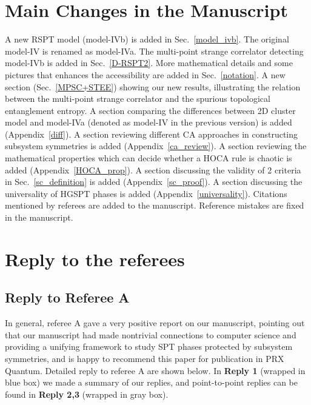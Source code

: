 \documentclass{article}
\begin{document}
\tableofcontents

\section{Main Changes in the Manuscript}
\begin{outline}[enumerate]
    \1 A new RSPT model (model-IVb) is added in Sec.~\ref{model_ivb}. The original model-IV is renamed as model-IVa.
    \1 The multi-point strange correlator detecting model-IVb is added in Sec.~\ref{D-RSPT2}.
    \1 More mathematical details and some pictures that enhances the accessibility are added in Sec.~\ref{notation}.
    \1 A new section (Sec.~\ref{MPSC+STEE}) showing our new results, illustrating the relation between the multi-point strange correlator and the spurious topological entanglement entropy.
    \1 A section comparing the differences between 2D cluster model and model-IVa (denoted as model-IV in the previous version) is added (Appendix~\ref{diff}).
    \1 A section reviewing different CA approaches in constructing subsystem symmetries is added (Appendix~\ref{ca_review}).
    \1 A section reviewing the mathematical properties which can decide whether a HOCA rule is chaotic is added (Appendix~\ref{HOCA_prop}).
    \1 A section discussing the validity of 2 criteria in Sec.~\ref{sc_definition} is added (Appendix~\ref{sc_proof}).
    \1 A section discussing the universality of HGSPT phases is added (Appendix~\ref{universality}). 
    \1 Citations mentioned by referees are added to the manuscript.
    \1 Reference mistakes are fixed in the manuscript.
    \end{outline}


\section{Reply to the referees}

\subsection{Reply to Referee A}
In general, referee A gave a very positive report on our manuscript, pointing out that our manuscript had made nontrivial connections to computer science and providing a unifying framework to study SPT phases protected by subsystem symmetries, and is happy to recommend this paper for
publication in PRX Quantum. Detailed reply to referee A are shown below. In \textbf{Reply 1} (wrapped in {\color{blue}blue box}) we made a summary of our replies, and point-to-point replies can be found in \textbf{Reply 2,3} (wrapped in {\color{gray}gray box}).  
\end{document}
